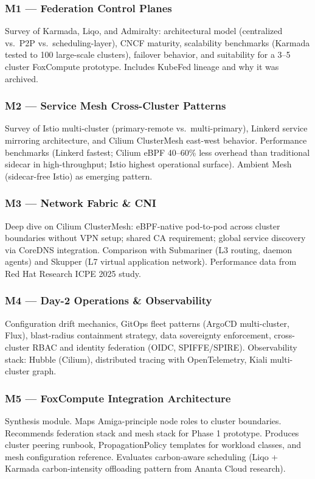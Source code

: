 \documentclass[11pt,letterpaper]{article}
\begin{document}
\subsubsection{M1 --- Federation Control Planes}
Survey of Karmada, Liqo, and Admiralty: architectural model (centralized vs.\ P2P vs.\ scheduling-layer), CNCF maturity, scalability benchmarks (Karmada tested to 100 large-scale clusters), failover behavior, and suitability for a 3--5 cluster FoxCompute prototype. Includes KubeFed lineage and why it was archived.

\subsubsection{M2 --- Service Mesh Cross-Cluster Patterns}
Survey of Istio multi-cluster (primary-remote vs.\ multi-primary), Linkerd service mirroring architecture, and Cilium ClusterMesh east-west behavior. Performance benchmarks (Linkerd fastest; Cilium eBPF 40--60\% less overhead than traditional sidecar in high-throughput; Istio highest operational surface). Ambient Mesh (sidecar-free Istio) as emerging pattern.

\subsubsection{M3 --- Network Fabric \& CNI}
Deep dive on Cilium ClusterMesh: eBPF-native pod-to-pod across cluster boundaries without VPN setup; shared CA requirement; global service discovery via CoreDNS integration. Comparison with Submariner (L3 routing, daemon agents) and Skupper (L7 virtual application network). Performance data from Red Hat Research ICPE 2025 study.

\subsubsection{M4 --- Day-2 Operations \& Observability}
Configuration drift mechanics, GitOps fleet patterns (ArgoCD multi-cluster, Flux), blast-radius containment strategy, data sovereignty enforcement, cross-cluster RBAC and identity federation (OIDC, SPIFFE/SPIRE). Observability stack: Hubble (Cilium), distributed tracing with OpenTelemetry, Kiali multi-cluster graph.

\subsubsection{M5 --- FoxCompute Integration Architecture}
Synthesis module. Maps Amiga-principle node roles to cluster boundaries. Recommends federation stack and mesh stack for Phase 1 prototype. Produces cluster peering runbook, PropagationPolicy templates for workload classes, and mesh configuration reference. Evaluates carbon-aware scheduling (Liqo + Karmada carbon-intensity offloading pattern from Ananta Cloud research).
\end{document}
